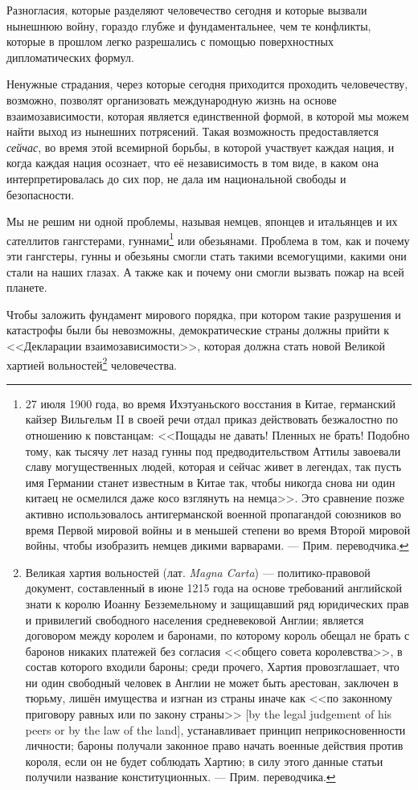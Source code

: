 Разногласия, которые разделяют человечество сегодня и которые вызвали нынешнюю войну, гораздо глубже и фундаментальнее, чем те конфликты, которые в прошлом легко разрешались с помощью поверхностных дипломатических формул.

Ненужные страдания, через которые сегодня приходится проходить человечеству, возможно, позволят организовать международную жизнь на основе взаимозависимости, которая является единственной формой, в которой мы можем найти выход из нынешних потрясений. Такая возможность предоставляется \textit{сейчас}, во время этой всемирной борьбы, в которой участвует каждая нация, и когда каждая нация осознает, что её независимость в том виде, в каком она интерпретировалась до сих пор, не дала им национальной свободы и безопасности.

Мы не решим ни одной проблемы, называя немцев, японцев и итальянцев и их сателлитов гангстерами, гуннами\footnote{%
27 июля 1900 года, во время Ихэтуаньского восстания в Китае, германский кайзер Вильгельм II в своей речи отдал приказ действовать безжалостно по отношению к повстанцам: <<Пощады не давать! Пленных не брать! Подобно тому, как тысячу лет назад гунны под предводительством Аттилы завоевали славу могущественных людей, которая и сейчас живет в легендах, так пусть имя Германии станет известным в Китае так, чтобы никогда снова ни один китаец не осмелился даже косо взглянуть на немца>>. Это сравнение позже активно использовалось антигерманской военной пропагандой союзников во время Первой мировой войны и в меньшей степени во время Второй мировой войны, чтобы изобразить немцев дикими варварами. — Прим. переводчика.} или обезьянами. Проблема в том, как и почему эти гангстеры, гунны и обезьяны смогли стать такими всемогущими, какими они стали на наших глазах. А также как и почему они смогли вызвать пожар на всей планете.

Чтобы заложить фундамент мирового порядка, при котором такие разрушения и катастрофы были бы невозможны, демократические страны должны прийти к <<Декларации взаимозависимости>>, которая должна стать новой Великой хартией вольностей\footnote{%
Великая хартия вольностей (лат. \textit{Magna Carta}) — политико-правовой документ, составленный в июне 1215 года на основе требований английской знати к королю Иоанну Безземельному и защищавший ряд юридических прав и привилегий свободного населения средневековой Англии; является договором между королем и баронами, по которому король обещал не брать с баронов никаких платежей без согласия <<общего совета королевства>>, в состав которого входили бароны; среди прочего, Хартия провозглашает, что ни один свободный человек в Англии не может быть арестован, заключен в тюрьму, лишён имущества и изгнан из страны иначе как <<по законному приговору равных или по закону страны>> [by the legal judgement of his peers or by the law of the land], устанавливает принцип неприкосновенности личности; бароны получали законное право начать военные действия против короля, если он не будет соблюдать Хартию; в силу этого данные статьи получили название конституционных.  — Прим. переводчика.} человечества.

